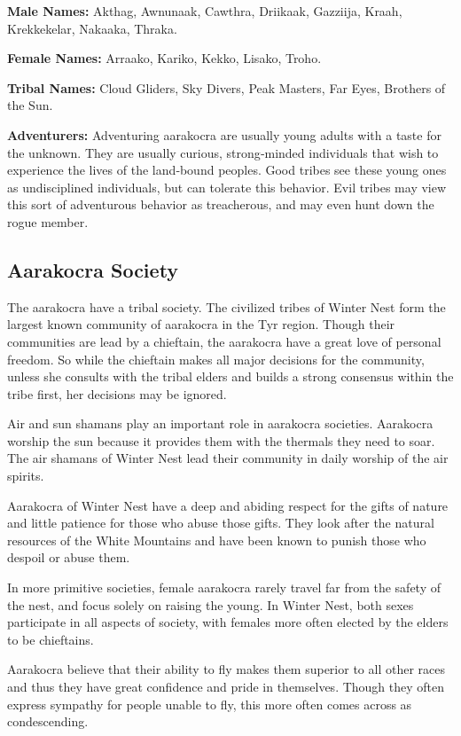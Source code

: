 \documentclass[10pt,a4paper,twocolumn]{d20}
\begin{document}
\textbf{Male Names:} Akthag, Awnunaak, Cawthra, Driikaak, Gazziija, Kraah, Krekkekelar, Nakaaka, Thraka.

\textbf{Female Names:} Arraako, Kariko, Kekko, Lisako, Troho.

\textbf{Tribal Names:} Cloud Gliders, Sky Divers, Peak Masters, Far Eyes, Brothers of the Sun.

\textbf{Adventurers:} Adventuring aarakocra are usually young adults with a taste for the unknown. They are usually curious, strong‐minded individuals that wish to experience the lives of the land‐bound peoples. Good tribes see these young ones as undisciplined individuals, but can tolerate this behavior. Evil tribes may view this sort of adventurous behavior as treacherous, and may even hunt down the rogue member.

\subsection{Aarakocra Society}
The aarakocra have a tribal society. The civilized tribes of Winter Nest form the largest known community of aarakocra in the Tyr region. Though their communities are lead by a chieftain, the aarakocra have a great love of personal freedom. So while the chieftain makes all major decisions for the community, unless she consults with the tribal elders and builds a strong consensus within the tribe first, her decisions may be ignored.

Air and sun shamans play an important role in aarakocra societies. Aarakocra worship the sun because it provides them with the thermals they need to soar. The air shamans of Winter Nest lead their community in daily worship of the air spirits.

Aarakocra of Winter Nest have a deep and abiding respect for the gifts of nature and little patience for those who abuse those gifts. They look after the natural resources of the White Mountains and have been known to punish those who despoil or abuse them.

In more primitive societies, female aarakocra rarely travel far from the safety of the nest, and focus solely on raising the young. In Winter Nest, both sexes participate in all aspects of society, with females more often elected by the elders to be chieftains.

Aarakocra believe that their ability to fly makes them superior to all other races and thus they have great confidence and pride in themselves. Though they often express sympathy for people unable to fly, this more often comes across as condescending.
\end{document}
